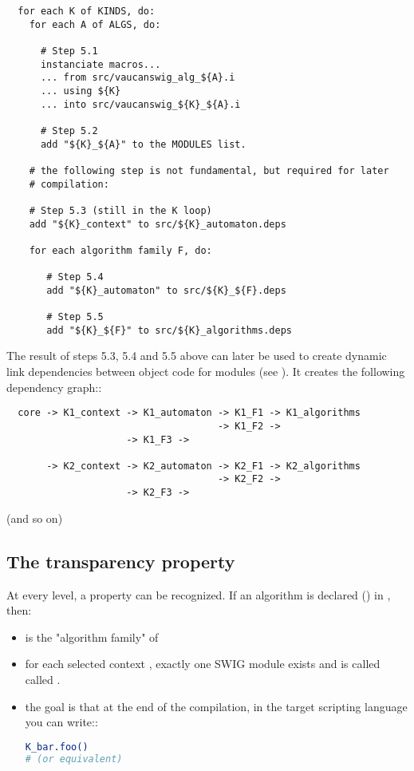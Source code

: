 \begin{lstlisting}
  for each K of KINDS, do:
    for each A of ALGS, do:

      # Step 5.1
      instanciate macros...
      ... from src/vaucanswig_alg_${A}.i
      ... using ${K}
      ... into src/vaucanswig_${K}_${A}.i

      # Step 5.2
      add "${K}_${A}" to the MODULES list.

    # the following step is not fundamental, but required for later
    # compilation:

    # Step 5.3 (still in the K loop)
    add "${K}_context" to src/${K}_automaton.deps

    for each algorithm family F, do:

       # Step 5.4
       add "${K}_automaton" to src/${K}_${F}.deps

       # Step 5.5
       add "${K}_${F}" to src/${K}_algorithms.deps
\end{lstlisting}

The result of steps 5.3, 5.4 and 5.5 above can later be used to create
dynamic link dependencies between object code for modules (see
). It creates the following dependency graph::

\begin{lstlisting}
  core -> K1_context -> K1_automaton -> K1_F1 -> K1_algorithms
                                     -> K1_F2 ->
				     -> K1_F3 ->

       -> K2_context -> K2_automaton -> K2_F1 -> K2_algorithms
                                     -> K2_F2 ->
				     -> K2_F3 ->
\end{lstlisting}

  (and so on)

\subsection{The transparency property}

At every level, a property can be recognized. If an algorithm
 is declared (\Cxx) in , then:
\begin{itemize}
\item {} is the "algorithm family" of 

\item for each selected context , exactly one SWIG module exists
  and is called called .

\item the goal is that at the end of the compilation, in the target
  scripting language you can write::
  \begin{lstlisting}[language=sh]
K_bar.foo()
# (or equivalent)
  \end{lstlisting}
\end{itemize}



